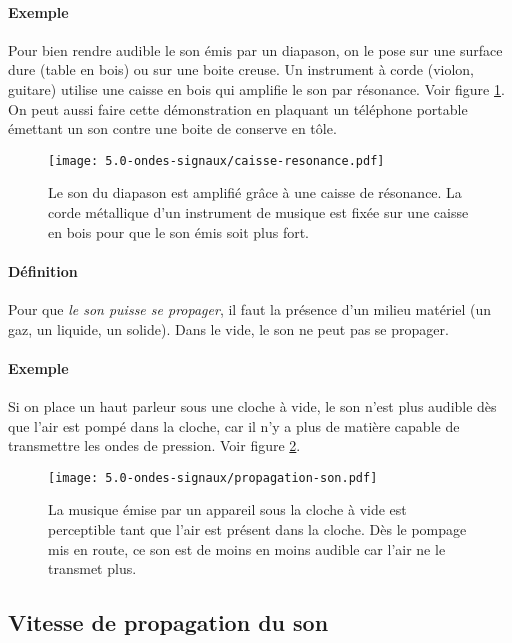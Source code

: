 \paragraph{Exemple} Pour bien rendre audible le son émis par un diapason, on le
pose sur une surface dure (table en bois) ou sur une boite creuse. Un instrument à corde (violon, guitare) utilise une caisse en bois qui amplifie le son par résonance. Voir figure \ref{fig:caisse-resonance}.
On peut aussi faire cette démonstration en plaquant un téléphone portable émettant 
un son contre une boite de conserve en tôle.
\begin{figure}[h!]
  \begin{center}
      \texttt{[image: 5.0-ondes-signaux/caisse-resonance.pdf]}
  \end{center}
  \caption{Le son du diapason est amplifié grâce à une caisse de résonance. La corde métallique d'un instrument de musique est fixée sur une caisse en bois pour que le son émis soit plus fort.}
  \label{fig:caisse-resonance}
\end{figure}

\paragraph{Définition} Pour que  \textit{le son puisse se propager}, il faut la présence d'un
milieu matériel (un gaz, un liquide, un solide). Dans le vide, le son ne peut pas
se propager.
\paragraph{Exemple} Si on place un haut parleur sous une cloche à vide, le son n'est plus audible dès que l'air est pompé dans la cloche, car il n'y a plus de matière capable de transmettre les ondes de pression. Voir figure \ref{fig:propagation-son}.
\begin{figure}[h!]
  \begin{center}
      \texttt{[image: 5.0-ondes-signaux/propagation-son.pdf]}
  \end{center}
  \caption{La musique émise par un appareil sous la cloche à vide est perceptible tant que l'air est présent dans la cloche. Dès le pompage mis en route, ce son est de moins en moins audible car l'air ne le transmet plus.}
  \label{fig:propagation-son}
\end{figure}

\subsection{Vitesse de propagation du son}
